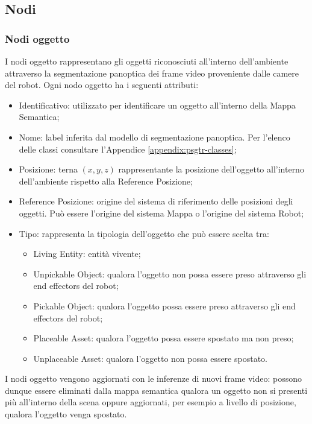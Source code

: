 \subsection{Nodi}
\subsubsection{Nodi oggetto}

I nodi oggetto rappresentano gli oggetti riconosciuti all'interno dell'ambiente attraverso la segmentazione panoptica dei frame video proveniente dalle camere del robot. Ogni nodo oggetto ha i seguenti attributi:
\begin{itemize}
  \item Identificativo: utilizzato per identificare un oggetto all'interno della Mappa Semantica;
  \item Nome: label inferita dal modello di segmentazione panoptica. Per l'elenco delle classi consultare l'Appendice \ref{appendix:psgtr-classes};
  \item Posizione: terna $(x, y, z)$ rappresentante la posizione dell'oggetto all'interno dell'ambiente rispetto alla Reference Posizione;
  \item Reference Posizione: origine del sistema di riferimento delle posizioni degli oggetti. Può essere l'origine del sistema Mappa o l'origine del sistema Robot;
  \item Tipo: rappresenta la tipologia dell'oggetto che può essere scelta tra:
        \begin{itemize}
          \item Living Entity: entità vivente;
          \item Unpickable Object: qualora l'oggetto non possa essere preso attraverso gli end effectors del robot;
          \item Pickable Object: qualora l'oggetto possa essere preso attraverso gli end effectors del robot;
          \item Placeable Asset: qualora l'oggetto possa essere spostato ma non preso;
          \item Unplaceable Asset: qualora l'oggetto non possa essere spostato.
        \end{itemize}
\end{itemize}
I nodi oggetto vengono aggiornati con le inferenze di nuovi frame video: possono dunque essere eliminati dalla mappa semantica qualora un oggetto non si presenti più all'interno della scena oppure aggiornati, per esempio a livello di posizione, qualora l'oggetto venga spostato.

